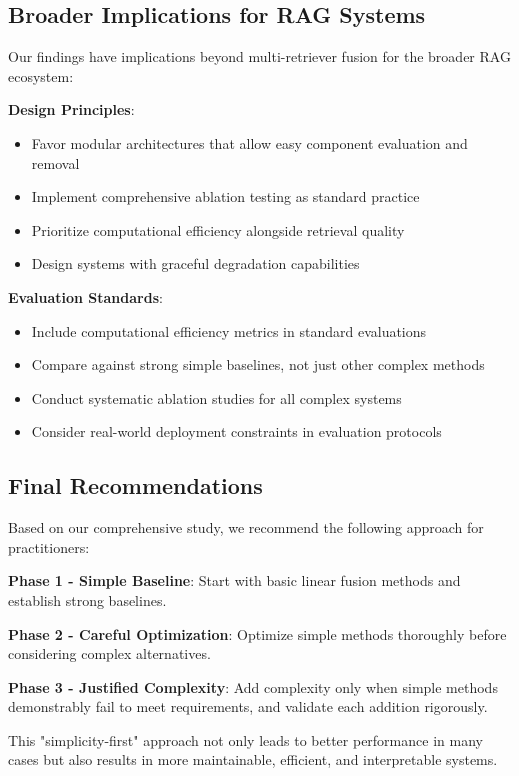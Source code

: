 \documentclass[letterpaper]{article} %
\begin{document}
\subsection{Broader Implications for RAG Systems}

Our findings have implications beyond multi-retriever fusion for the broader RAG ecosystem:

\textbf{Design Principles}:
\begin{itemize}
\item Favor modular architectures that allow easy component evaluation and removal
\item Implement comprehensive ablation testing as standard practice
\item Prioritize computational efficiency alongside retrieval quality
\item Design systems with graceful degradation capabilities
\end{itemize}

\textbf{Evaluation Standards}:
\begin{itemize}
\item Include computational efficiency metrics in standard evaluations
\item Compare against strong simple baselines, not just other complex methods
\item Conduct systematic ablation studies for all complex systems
\item Consider real-world deployment constraints in evaluation protocols
\end{itemize}

\subsection{Final Recommendations}

Based on our comprehensive study, we recommend the following approach for practitioners:

\textbf{Phase 1 - Simple Baseline}: Start with basic linear fusion methods and establish strong baselines.

\textbf{Phase 2 - Careful Optimization}: Optimize simple methods thoroughly before considering complex alternatives.

\textbf{Phase 3 - Justified Complexity}: Add complexity only when simple methods demonstrably fail to meet requirements, and validate each addition rigorously.

This "simplicity-first" approach not only leads to better performance in many cases but also results in more maintainable, efficient, and interpretable systems.
\end{document}
